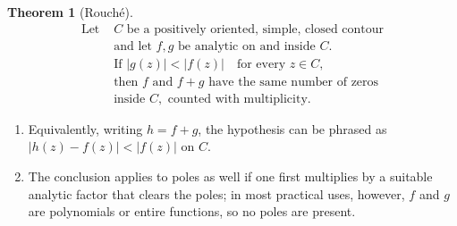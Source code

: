 \documentclass[12pt]{article}
\theoremstyle{definition} %
\newtheorem{theorem}{Theorem}
\theoremstyle{plain} %
\begin{document}
\begin{theorem}[Rouch\'e]
    \begin{align}
        \text{Let }&C\text{ be a positively oriented, simple, closed contour} \\
        &\text{and let }f,g\text{ be analytic on and inside }C. \\
        &\text{If }|g(z)|<|f(z)|\quad\text{for every }z\in C, \\
        &\text{then }f\text{ and }f+g\text{ have the same number of zeros} \\
        &\text{inside }C,\text{ counted with multiplicity.}
    \end{align}

    \begin{enumerate}
        \item Equivalently, writing $h=f+g$, the hypothesis can be phrased as
              $|h(z)-f(z)|<|f(z)|$ on $C$.
        \item The conclusion applies to poles as well if one first multiplies
              by a suitable analytic factor that clears the poles; in most
              practical uses, however, $f$ and $g$ are polynomials or entire
              functions, so no poles are present.
    \end{enumerate}
\end{theorem}
\end{document}
